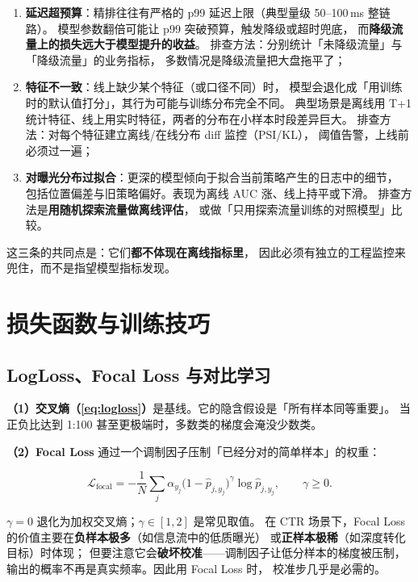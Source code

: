 \begin{pitfall}
\begin{enumerate}
  \item \textbf{延迟超预算}：精排往往有严格的 p99 延迟上限（典型量级 50--100\,ms 整链路）。
        模型参数翻倍可能让 p99 突破预算，触发降级或超时兜底，
        而\textbf{降级流量上的损失远大于模型提升的收益}。
        排查方法：分别统计「未降级流量」与「降级流量」的业务指标，
        多数情况是降级流量把大盘拖平了；
  \item \textbf{特征不一致}：线上缺少某个特征（或口径不同）时，
        模型会退化成「用训练时的默认值打分」，其行为可能与训练分布完全不同。
        典型场景是离线用 T+1 统计特征、线上用实时特征，两者的分布在小样本时段差异巨大。
        排查方法：对每个特征建立离线/在线分布 diff 监控（PSI/KL），
        阈值告警，上线前必须过一遍；
  \item \textbf{对曝光分布过拟合}：更深的模型倾向于拟合当前策略产生的日志中的细节，
        包括位置偏差与旧策略偏好。表现为离线 AUC 涨、线上持平或下滑。
        排查方法是\textbf{用随机探索流量做离线评估}，
        或做「只用探索流量训练的对照模型」比较。
\end{enumerate}
这三条的共同点是：它们\textbf{都不体现在离线指标里}，
因此必须有独立的工程监控来兜住，而不是指望模型指标发现。
\end{pitfall}

\section{损失函数与训练技巧}

\subsection{LogLoss、Focal Loss 与对比学习}

\textbf{（1）交叉熵（\cref{eq:logloss}）}是基线。它的隐含假设是「所有样本同等重要」。
当正负比达到 1:100 甚至更极端时，多数类的梯度会淹没少数类。

\textbf{（2）Focal Loss} 通过一个调制因子压制「已经分对的简单样本」的权重：

\begin{equation}
\mathcal{L}_{\mathrm{focal}} = -\frac{1}{N}\sum_{j} \alpha_{y_j} \big( 1 - \hat{p}_{j,y_j} \big)^{\gamma}
\log \hat{p}_{j,y_j} ,
\qquad \gamma \ge 0 .
\label{eq:focal}
\end{equation}

$\gamma = 0$ 退化为加权交叉熵；$\gamma \in [1, 2]$ 是常见取值。
在 CTR 场景下，Focal Loss 的价值主要在\textbf{负样本极多}（如信息流中的低质曝光）
或\textbf{正样本极稀}（如深度转化目标）时体现；
但要注意它会\textbf{破坏校准}——调制因子让低分样本的梯度被压制，
输出的概率不再是真实频率。因此用 Focal Loss 时，
校准步几乎是必需的。


